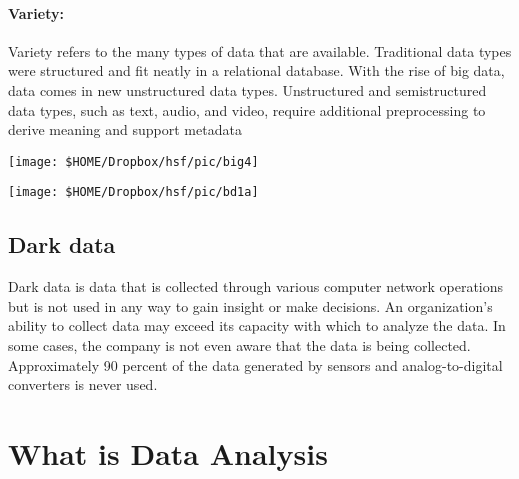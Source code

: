 \paragraph{Variety:} Variety refers to the many types of data that are available. Traditional data types were structured and fit neatly in a relational
database. With the rise of big data, data comes in new unstructured data types. Unstructured and semistructured data types, such as
text, audio, and video, require additional preprocessing to derive meaning and support metadata


\texttt{[image: \$HOME/Dropbox/hsf/pic/big4]}

\texttt{[image: \$HOME/Dropbox/hsf/pic/bd1a]}


\pbn
\subsection{Dark data}
Dark data is data that is collected through various computer network operations but is not used in any way to gain insight or make decisions. An organization's ability to collect data may exceed its capacity with which to analyze the data. In some cases, the company is not even aware that the data is being collected. Approximately 90 percent of the data generated by sensors and analog-to-digital converters is never used.




\pbn
\section{What is Data Analysis}


\pbn
{}

